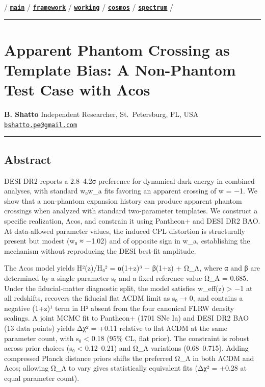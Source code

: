 / \textbf{\href{../../../README.md}{\texttt{main}}} /
\textbf{\href{../../framework/}{\texttt{framework}}} /
\textbf{\href{../}{\texttt{working}}} /
\textbf{\href{../../cosmos/}{\texttt{cosmos}}} /
\textbf{\href{../../spectrum/}{\texttt{spectrum}}} /

\begin{center}\rule{0.5\linewidth}{0.5pt}\end{center}

\section{Apparent Phantom Crossing as Template Bias: A Non-Phantom Test
Case with
Λcos}\label{apparent-phantom-crossing-as-template-bias-a-non-phantom-test-case-with-ux3bbcos}

\textbf{B. Shatto} Independent Researcher, St.~Petersburg, FL, USA
\href{mailto:bshatto.pe@gmail.com}{\nolinkurl{bshatto.pe@gmail.com}}

\begin{center}\rule{0.5\linewidth}{0.5pt}\end{center}

\subsection{Abstract}\label{abstract}

DESI DR2 reports a 2.8--4.2σ preference for dynamical dark energy in
combined analyses, with standard w₀w\_a fits favoring an apparent
crossing of w = −1. We show that a non-phantom expansion history can
produce apparent phantom crossings when analyzed with standard
two-parameter templates. We construct a specific realization, Λcos, and
constrain it using Pantheon+ and DESI DR2 BAO. At data-allowed parameter
values, the induced CPL distortion is structurally present but modest
(w₀ ≈ −1.02) and of opposite sign in w\_a, establishing the mechanism
without reproducing the DESI best-fit amplitude.

The Λcos model yields H²(z)/H₀² = α(1+z)³ − β(1+z) + Ω\_Λ, where α and β
are determined by a single parameter s₀ and a fixed reference value Ω\_Λ
= 0.685. Under the fiducial-matter diagnostic split, the model satisfies
w\_eff(z) \textgreater{} −1 at all redshifts, recovers the fiducial flat
ΛCDM limit as s₀ → 0, and contains a negative (1+z)¹ term in H² absent
from the four canonical FLRW density scalings. A joint MCMC fit to
Pantheon+ (1701 SNe Ia) and DESI DR2 BAO (13 data points) yields Δχ² =
+0.11 relative to flat ΛCDM at the same parameter count, with s₀
\textless{} 0.18 (95\% CL, flat prior). The constraint is robust across
prior choices (s₀ \textless{} 0.12--0.21) and Ω\_Λ variations
(0.68--0.715). Adding compressed Planck distance priors shifts the
preferred Ω\_Λ in both ΛCDM and Λcos; allowing Ω\_Λ to vary gives
statistically equivalent fits (Δχ² = +0.28 at equal parameter count).

